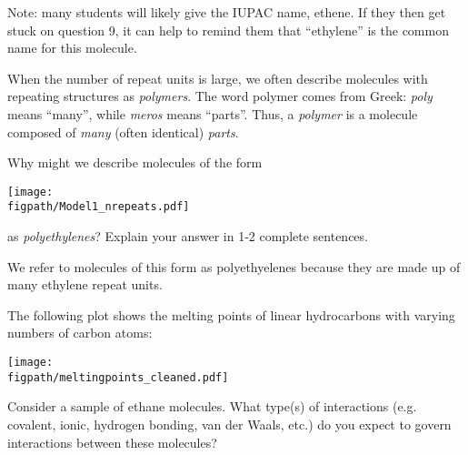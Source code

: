 \begin{activity}
\begin{ctqs}
\begin{solution}[0.75in]
			Note: many students will likely give the IUPAC name, ethene.  If they then get stuck on question 9, it can help to remind them that ``ethylene'' is the common name for this molecule.
		\end{solution}
	
\end{ctqs}

\begin{infobox}
	When the number of repeat units is large, we often describe molecules with repeating structures as \emph{polymers}.  The word polymer comes from Greek: \emph{poly} means ``many'', while \emph{meros} means ``parts''.  Thus, a \emph{polymer} is a molecule composed of \emph{many} (often identical) \emph{parts}.
\end{infobox}

\begin{ctqs}
	\question Why might we describe molecules of the form
	
		\centerline{\texttt{[image: \\figpath/Model1\_nrepeats.pdf]}}
			
		as \emph{polyethylenes}?  Explain your answer in 1-2 complete sentences.
		
		\begin{solution}[2in]
			We refer to molecules of this form as polyethyelenes because they are made up of many ethylene repeat units.
		\end{solution}
\end{ctqs}

\clearpage
\begin{model}
	\label{\labelbase:mdl:hydrocarbonmelting}

	The following plot shows the melting points of linear hydrocarbons with varying numbers of carbon atoms:
	
	\vspace{6pt}
	
	\centerline{\texttt{[image: \\figpath/meltingpoints\_cleaned.pdf]}}
	
	\vspace{6pt}

\end{model}

\begin{ctqs}
	
	\question Consider a sample of ethane molecules.  What type(s) of interactions (e.g. covalent, ionic, hydrogen bonding, van der Waals, etc.) do you expect to govern interactions between these molecules?%
	

\end{ctqs}
\end{activity}
